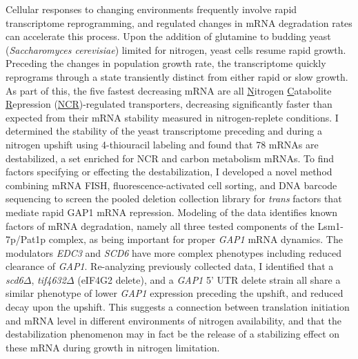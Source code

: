 \documentclass[12pt,letterpaper]{memoir}
\begin{document}
Cellular responses to changing environments frequently involve rapid
transcriptome reprogramming, and regulated changes in mRNA 
degradation rates can accelerate this process.
Upon the addition of glutamine to budding yeast 
(\textit{Saccharomyces cerevisiae}) limited for nitrogen,
yeast cells resume rapid growth. 
Preceding the changes in population growth rate,
the transcriptome quickly reprograms through a state transiently 
distinct from either rapid or slow growth.
As part of this,
the five fastest decreasing mRNA are all 
\underline{N}itrogen \underline{C}atabolite \underline{R}epression 
(\underline{NCR})-regulated transporters, decreasing 
significantly faster than expected from their mRNA 
stability measured in nitrogen-replete conditions.
I determined the stability of the yeast transcriptome 
preceding and during a nitrogen upshift using 
4-thiouracil labeling and found that 78 mRNAs are destabilized,
a set enriched for NCR and carbon metabolism mRNAs.
To find factors specifying or effecting the destabilization, I
developed a novel method combining mRNA FISH, fluorescence-activated
cell sorting, and DNA barcode sequencing to screen the pooled deletion
collection library for \textit{trans} factors that mediate rapid GAP1 mRNA
repression. 
%
%
Modeling of the data identifies known factors of mRNA
degradation, namely all three tested components of the
Lsm1-7p/Pat1p complex, as being important for proper \textit{GAP1}
mRNA dynamics. The modulators \textit{EDC3} and \textit{SCD6}
have more complex phenotypes including reduced clearance of
\textit{GAP1}. Re-analyzing previously collected data,
I identified that a \textit{scd6}$\Delta$, \textit{tif4632}$\Delta$
(eIF4G2 delete), and a \textit{GAP1} 5' UTR delete strain all
share a similar phenotype of lower \textit{GAP1} expression preceding
the upshift, and reduced decay upon the upshift. This suggests a
connection between translation initiation and mRNA level in different
environments of nitrogen availability, and that the destabilization 
phenomenon may in fact be the release of a stabilizing effect on these 
mRNA during growth in nitrogen limitation.

\newpage

{\OnehalfSpacing
\tableofcontents*}

\listoffigures

\mainmatter







\OnehalfSpacing

\printbibliography[heading=bibintoc,title={References}]
\end{document}
